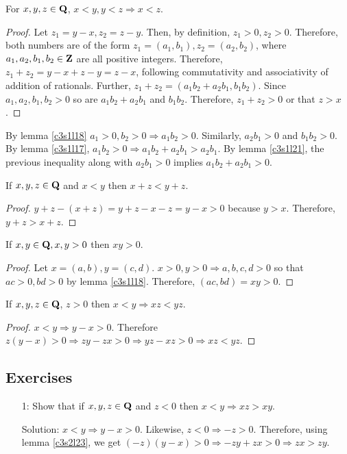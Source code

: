 \begin{lem}\label{c3s2l21}
For $x, y, z \in \mathbf{Q}$, $x < y, y < z \Rightarrow x < z$.
\end{lem}
\begin{proof}
Let $z_1 = y - x, z_2 = z - y$. Then, by definition, $z_1 > 0, z_2 > 0$.
Therefore, both numbers are of the form $z_1 = (a_1, b_1), z_2 = (a_2, 
b_2)$, where $a_1, a_2, b_1, b_2 \in \mathbf{Z}$ are all positive integers. 
Therefore, $z_1 + z_2 = y - x + z - y = z - x$, following commutativity
and associativity of addition of rationals. Further, $z_1 + z_2 = (a_1b_2
+ a_2b_1, b_1b_2)$. Since $a_1, a_2, b_1, b_2 > 0$ so are $a_1b_2 + 
a_2b_1$ and $b_1b_2$. Therefore, $z_1 + z_2 > 0$ or that $z > x$.
\end{proof}

\begin{rem}
By lemma \ref{c3s1l18} $a_1 > 0, b_2 > 0 \Rightarrow a_1b_2 > 0$. 
Similarly, $a_2b_1 > 0$ and $b_1b_2 > 0$. By lemma \ref{c3s1l17}, $a_1b_2 
> 0 \Rightarrow a_1b_2 + a_2b_1 > a_2b_1$. By lemma \ref{c3s1l21}, the 
previous inequality along with $a_2b_1 > 0$ implies $a_1b_2 + a_2b_1 > 0$.
\end{rem}

\begin{lem}\label{c3s2l22}
If $x, y, z \in \mathbf{Q}$ and $x < y$ then $x + z < y + z$.
\end{lem}
\begin{proof}
$y + z - (x + z) = y + z - x - z = y - x > 0$ because $y > x$. Therefore,
$y +z > x + z$.
\end{proof}

\begin{lem}\label{c3s2l23}
If $x, y \in \mathbf{Q}, x, y > 0$ then $xy > 0$.
\end{lem}
\begin{proof}
Let $x = (a, b), y = (c, d)$. $x > 0, y > 0 \Rightarrow a, b, c, d > 0$
so that $ac > 0, bd > 0$ by lemma \ref{c3s1l18}. Therefore, $(ac, bd) =
xy > 0$.
\end{proof}

\begin{lem}\label{c3s2l24}
If $x, y, z \in \mathbf{Q}$, $z > 0$ then $x < y \Rightarrow xz < yz$.
\end{lem}
\begin{proof}
$x < y \Rightarrow y - x > 0$. Therefore $z(y - x) > 0 \Rightarrow zy - zx
> 0 \Rightarrow yz - xz > 0 \Rightarrow xz < yz$.
\end{proof}

\subsection{Exercises}
\begin{enumerate}
\item[1:] Show that if $x, y, z \in \mathbf{Q}$ and $z < 0$ then $x < y 
\Rightarrow xz > xy$.
\item[Solution:] $x < y \Rightarrow y - x > 0$. Likewise, $z < 0 
\Rightarrow -z > 0$. Therefore, using lemma \ref{c3s2l23}, we get $(-z)
(y - x) > 0 \Rightarrow -zy + zx > 0 \Rightarrow zx > zy$.
\end{enumerate}

